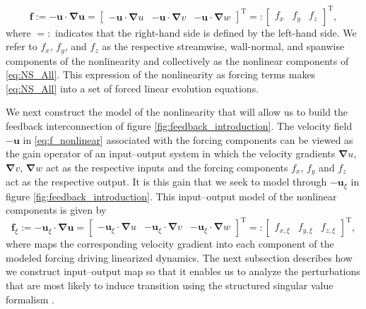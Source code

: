 \begin{equation}
\boldsymbol{f}:=-\boldsymbol{u}\cdot \boldsymbol{\nabla }\boldsymbol{u}=\begin{bmatrix}-\boldsymbol{u}\cdot \boldsymbol{\nabla }u &-\boldsymbol{u}\cdot \boldsymbol{\nabla }v& -\boldsymbol{u}\cdot \boldsymbol{\nabla }w\end{bmatrix}^\text{T}=:\begin{bmatrix}f_x&f_y&f_z\end{bmatrix}^\text{T}, 
     \label{eq:f_nonlinear}
\end{equation}
where $=:$ indicates that the right-hand side is defined by the left-hand side. We refer to $f_x$, $f_y$, and $f_z$ as the respective streamwise, wall-normal, and spanwise components of the nonlinearity and collectively as the nonlinear components of \eqref{eq:NS_All}. This expression of the nonlinearity as forcing terms makes \eqref{eq:NS_All} into a set of forced linear evolution equations. 

We next construct the model of the nonlinearity that will allow us to build the feedback interconnection of figure \ref{fig:feedback_introduction}. The velocity field $-\boldsymbol{u}$ in \eqref{eq:f_nonlinear}  associated with the forcing components can be viewed as the gain operator of an input--output system in which the velocity gradients  $\boldsymbol{\nabla} u$, $\boldsymbol{\nabla} v$, $\boldsymbol{\nabla} w$ act as the respective inputs and the forcing components $f_x$, $f_y$ and $f_z$ act as the respective output. It is this gain that we seek to model through $-\boldsymbol{u}_{\xi}$ in figure \ref{fig:feedback_introduction}. This input--output model of the  nonlinear components is given by
\begin{equation}
    \boldsymbol{f}_{\xi}:=-\boldsymbol{u}_{\xi}\cdot \boldsymbol{\nabla }\boldsymbol{u}=\begin{bmatrix}-\boldsymbol{u}_{\xi}\cdot \boldsymbol{\nabla }u &-\boldsymbol{u}_{\xi}\cdot \boldsymbol{\nabla }v& -\boldsymbol{u}_{\xi}\cdot \boldsymbol{\nabla }w\end{bmatrix}^\text{T}=:\begin{bmatrix}f_{x,\xi}&f_{y,\xi}&f_{z,\xi}\end{bmatrix}^\text{T}, 
     \label{eq:f_uncertain_model}
\end{equation}
where  maps the corresponding velocity gradient into each component of the modeled  forcing driving linearized dynamics.  The next subsection describes how we construct  input--output map so that it enables us to analyze the perturbations that are most likely to induce transition using the structured singular value formalism \citep{packard1993complex,zhou1996robust}.


